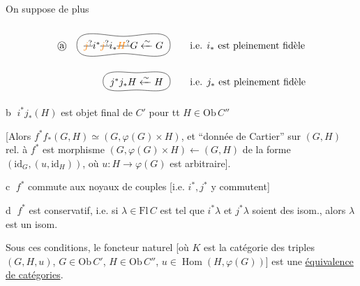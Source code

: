 \margin{$+$}

On suppose de plus

\[
\begin{aligned}
\text{\textcircled{a}}\quad \tikz[baseline=(p.base)]{\node[inner xsep=7pt,inner ysep=3pt] (p) {$\deleted{\unsure{j}}i^*\deleted{\unsure{j}}i_*\deleted{\unsure{H}}G\xleftarrow{\sim}G$};\draw[thin] (p.west) to[out=90,in=180] (p.north) to[out=0,in=90] (p.east) to[out=-90,in=0] (p.south) to[out=180,in=-90] (p.west) -- cycle;}&\qquad\text{i.e. $i_*$ est pleinement fidèle}\\
\tikz[baseline=(p.base)]{\node[inner xsep=7pt,inner ysep=3pt] (p) {$j^*j_*H\xleftarrow{\sim}H$};\draw[thin] (p.west) to[out=90,in=180] (p.north) to[out=0,in=90] (p.east) to[out=-90,in=0] (p.south) to[out=180,in=-90] (p.west) -- cycle;}&\qquad\text{i.e. $j_*$ est pleinement fidèle}
\end{aligned}
\]

\margin{$\times$}

\textcircled{b} $i^*j_*(H)$ est objet final de $C'$ pour tt $H\in\mathrm{Ob}\,C''$

[Alors $f^*f_*(G,H)\simeq(G,\varphi(G)\times H)$, et  ``donnée de Cartier'' sur $(G,H)$ rel. à $f^*$ est  morphisme $(G,\varphi(G)\times H)\leftarrow(G,H)$ de la forme $(\mathrm{id}_G,(u,\mathrm{id}_H))$, où $u:H\to\varphi(G)$ est arbitraire].


\textcircled{c}  $f^*$ commute aux noyaux de couples [i.e. $i^*,j^*$ y commutent]



\textcircled{d} $f^*$ est conservatif, i.e. si $\lambda\in\mathrm{Fl}\,C$ est tel que $i^*\lambda$ et $j^*\lambda$ soient des isom., alors $\lambda$ est un isom.

Sous ces conditions, le foncteur naturel
[où $K$ est la  catégorie des triples $(G,H,u)$, $G\in\mathrm{Ob}\,C'$, $H\in\mathrm{Ob}\,C''$, $u\in\operatorname{Hom}(H,\varphi(G))$] est une \uline{équivalence de catégories}.

